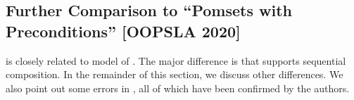 



\subsection{Further Comparison to ``Pomsets with Preconditions'' [OOPSLA 2020]}
\label{sec:diff}

\PwTmca{} is closely related to \PwP{} model of
\citep{DBLP:journals/pacmpl/JagadeesanJR20}.  The major difference is that
\PwTmca{} supports sequential composition.  In the remainder of this section,
we discuss other differences.  We also point out some errors in
\cite{DBLP:journals/pacmpl/JagadeesanJR20}, all of which have been confirmed
by the authors.


